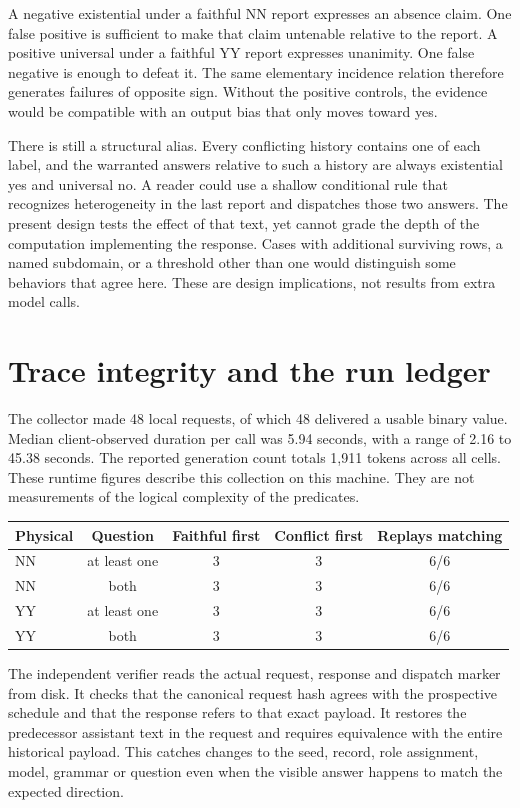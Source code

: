 \documentclass[12pt,letterpaper]{article}
\begin{document}
A negative existential under a faithful NN report expresses an absence claim. One false positive is sufficient to make that claim untenable relative to the report. A positive universal under a faithful YY report expresses unanimity. One false negative is enough to defeat it. The same elementary incidence relation therefore generates failures of opposite sign. Without the positive controls, the evidence would be compatible with an output bias that only moves toward yes.

There is still a structural alias. Every conflicting history contains one of each label, and the warranted answers relative to such a history are always existential yes and universal no. A reader could use a shallow conditional rule that recognizes heterogeneity in the last report and dispatches those two answers. The present design tests the effect of that text, yet cannot grade the depth of the computation implementing the response. Cases with additional surviving rows, a named subdomain, or a threshold other than one would distinguish some behaviors that agree here. These are design implications, not results from extra model calls.

\clearpage\section{Trace integrity and the run ledger}

The collector made 48 local requests, of which 48 delivered a usable binary value. Median client-observed duration per call was 5.94 seconds, with a range of 2.16 to 45.38 seconds. The reported generation count totals 1,911 tokens across all cells. These runtime figures describe this collection on this machine. They are not measurements of the logical complexity of the predicates.

\begin{center}\small\begin{tabular}{@{}lcccc@{}}\toprule
Physical & Question & Faithful first & Conflict first & Replays matching\\\midrule
NN & at least one & 3 & 3 & 6/6\\
NN & both & 3 & 3 & 6/6\\
YY & at least one & 3 & 3 & 6/6\\
YY & both & 3 & 3 & 6/6\\\bottomrule\end{tabular}\end{center}

The independent verifier reads the actual request, response and dispatch marker from disk. It checks that the canonical request hash agrees with the prospective schedule and that the response refers to that exact payload. It restores the predecessor assistant text in the request and requires equivalence with the entire historical payload. This catches changes to the seed, record, role assignment, model, grammar or question even when the visible answer happens to match the expected direction.
\end{document}
